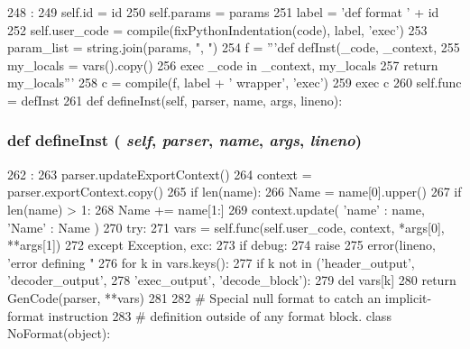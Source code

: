 \begin{DoxyCode}
248                                         :
249         self.id = id
250         self.params = params
251         label = 'def format ' + id
252         self.user_code = compile(fixPythonIndentation(code), label, 'exec')
253         param_list = string.join(params, ", ")
254         f = '''def defInst(_code, _context, %
255                 my_locals = vars().copy()
256                 exec _code in _context, my_locals
257                 return my_locals\n''' %
258         c = compile(f, label + ' wrapper', 'exec')
259         exec c
260         self.func = defInst
261 
    def defineInst(self, parser, name, args, lineno):
\end{DoxyCode}
\hypertarget{classisa__parser_1_1Format_a3e5cbc15d52ce2de63894dbe9e35135f}{
\subsubsection[{defineInst}]{\setlength{\rightskip}{0pt plus 5cm}def defineInst ( {\em self}, \/   {\em parser}, \/   {\em name}, \/   {\em args}, \/   {\em lineno})}}
\label{classisa__parser_1_1Format_a3e5cbc15d52ce2de63894dbe9e35135f}



\begin{DoxyCode}
262                                                     :
263         parser.updateExportContext()
264         context = parser.exportContext.copy()
265         if len(name):
266             Name = name[0].upper()
267             if len(name) > 1:
268                 Name += name[1:]
269         context.update({ 'name' : name, 'Name' : Name })
270         try:
271             vars = self.func(self.user_code, context, *args[0], **args[1])
272         except Exception, exc:
273             if debug:
274                 raise
275             error(lineno, 'error defining "%
276         for k in vars.keys():
277             if k not in ('header_output', 'decoder_output',
278                          'exec_output', 'decode_block'):
279                 del vars[k]
280         return GenCode(parser, **vars)
281 
282 # Special null format to catch an implicit-format instruction
283 # definition outside of any format block.
class NoFormat(object):
\end{DoxyCode}


